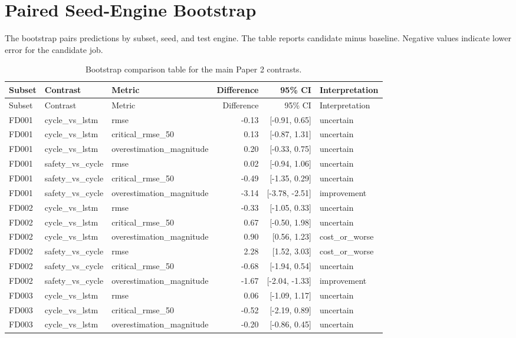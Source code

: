 \documentclass[10pt]{article}
\begin{document}
\section{Paired Seed-Engine Bootstrap}
The bootstrap pairs predictions by subset, seed, and test engine. The table reports candidate minus baseline. Negative values indicate lower error for the candidate job.

\scriptsize
\begin{longtable}{lllrrl}
\caption{Bootstrap comparison table for the main Paper 2 contrasts.}\\
\toprule
Subset & Contrast & Metric & Difference & 95\% CI & Interpretation \\
\midrule
\endfirsthead
\toprule
Subset & Contrast & Metric & Difference & 95\% CI & Interpretation \\
\midrule
\endhead
FD001 & cycle\_vs\_lstm & rmse & -0.13 & [-0.91, 0.65] & uncertain \\
FD001 & cycle\_vs\_lstm & critical\_rmse\_50 & 0.13 & [-0.87, 1.31] & uncertain \\
FD001 & cycle\_vs\_lstm & overestimation\_magnitude & 0.20 & [-0.33, 0.75] & uncertain \\
FD001 & safety\_vs\_cycle & rmse & 0.02 & [-0.94, 1.06] & uncertain \\
FD001 & safety\_vs\_cycle & critical\_rmse\_50 & -0.49 & [-1.35, 0.29] & uncertain \\
FD001 & safety\_vs\_cycle & overestimation\_magnitude & -3.14 & [-3.78, -2.51] & improvement \\
FD002 & cycle\_vs\_lstm & rmse & -0.33 & [-1.05, 0.33] & uncertain \\
FD002 & cycle\_vs\_lstm & critical\_rmse\_50 & 0.67 & [-0.50, 1.98] & uncertain \\
FD002 & cycle\_vs\_lstm & overestimation\_magnitude & 0.90 & [0.56, 1.23] & cost\_or\_worse \\
FD002 & safety\_vs\_cycle & rmse & 2.28 & [1.52, 3.03] & cost\_or\_worse \\
FD002 & safety\_vs\_cycle & critical\_rmse\_50 & -0.68 & [-1.94, 0.54] & uncertain \\
FD002 & safety\_vs\_cycle & overestimation\_magnitude & -1.67 & [-2.04, -1.33] & improvement \\
FD003 & cycle\_vs\_lstm & rmse & 0.06 & [-1.09, 1.17] & uncertain \\
FD003 & cycle\_vs\_lstm & critical\_rmse\_50 & -0.52 & [-2.19, 0.89] & uncertain \\
FD003 & cycle\_vs\_lstm & overestimation\_magnitude & -0.20 & [-0.86, 0.45] & uncertain \\

\end{longtable}
\end{document}
